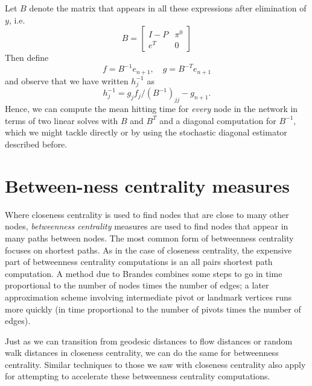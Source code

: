 \documentclass[12pt, leqno]{article} %
\begin{document}
Let $B$ denote the matrix that appears in all these expressions after
elimination of $y$, i.e.
\[
  B = \begin{bmatrix} I-P & \pi^0 \\ e^T & 0 \end{bmatrix}
\]
Then define
\[
  f = B^{-1} e_{n+1}, \quad g = B^{-T} e_{n+1}
\]
and observe that we have written $h_j^{-1}$ as
\[
  h_j^{-1} = g_j f_j / (B^{-1})_{jj} - g_{n+1}.
\]
Hence, we can compute the mean hitting time for {\em every} node in
the network in terms of two linear solves with $B$ and $B^T$ and a
diagonal computation for $B^{-1}$, which we might tackle directly or
by using the stochastic diagonal estimator described before.

\section{Between-ness centrality measures}


Where closeness centrality is used to find nodes that are close to
many other nodes, {\em betweenness centrality} measures are used to find
nodes that appear in many paths between nodes.  The most common form
of betweenness centrality focuses on shortest paths.  As in the case
of closeness centrality, the expensive part of betweenness centrality
computations is an all pairs shortest path computation.  A method due
to Brandes combines some steps to go in time proportional to the
number of nodes times the number of edges; a later approximation
scheme involving intermediate pivot or landmark vertices runs more
quickly (in time proportional to the number of pivots times the number
of edges).

Just as we can transition from geodesic distances to flow distances or
random walk distances in closeness centrality, we can do the same for
betweenness centrality.  Similar techniques to those we saw with
closeness centrality also apply for attempting to accelerate these
betweenness centrality computations.
\end{document}

